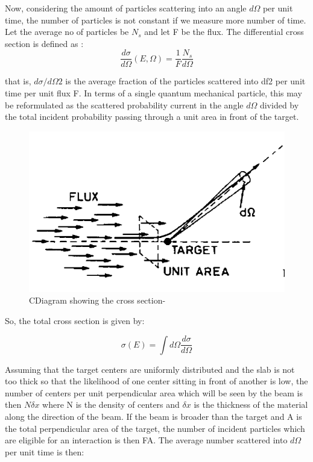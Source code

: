 \documentclass{article}
\begin{document}
\begin{multicols}{2}
Now, considering the amount of particles scattering into an angle 
$d\Omega$ per unit time, the number of particles is not constant if we 
measure more number of time. Let the average no of particles be $N_s$ and let F
be the flux. The differential cross section is defined as :
\begin{equation}
    \frac{d\sigma}{d\Omega} (E,\Omega) = \frac{1}{F}  \frac{N_s}{d\Omega}
\end{equation}

that is, $d\sigma/d\Omega2$ is the average fraction of the particles scattered into df2 per unit time per
unit flux F. In terms of a single quantum mechanical particle, this may be reformulated
as the scattered probability current in the angle $d\Omega$ divided by the total incident
probability passing through a unit area in front of the target.


\begin{figure}[H]
    \centering	
     \includegraphics[width=\columnwidth]{crossection.png}
     \caption{CDiagram showing the cross section-\cite{leo1988techniques}}
     \label{CSdiag}
\end{figure}

So, the total cross section is given by:

\begin{equation}
    \sigma(E)=\int d \Omega \frac{d \sigma}{d \Omega}
\end{equation}


Assuming that the target centers are uniformly distributed and 
the slab is not too thick so that the likelihood of one center sitting 
in front of another is low, the number of centers per unit perpendicular 
area which will be seen by the beam is then $N\delta x$ where N is the 
density of centers and $\delta x$ is the thickness of the material along 
the direction of the beam. If the beam is broader than the target and A is 
the total perpendicular area of the target, the number of incident particles 
which are eligible for an interaction is then FA. The average number scattered 
into $d\Omega$ per unit time is then:


\end{multicols}
\end{document}
